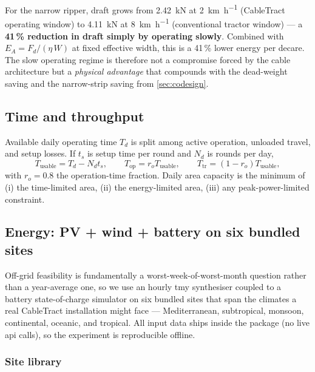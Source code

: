 \documentclass[11pt,a4paper]{article}
\begin{document}
For the narrow ripper, draft grows from \SI{2.42}{\kilo\newton} at \SI{2}{\kilo\meter\per\hour} (CableTract operating window) to \SI{4.11}{\kilo\newton} at \SI{8}{\kilo\meter\per\hour} (conventional tractor window) --- a \textbf{41\,\% reduction in draft simply by operating slowly}. Combined with $E_A = F_d/(\eta\,W)$ at fixed effective width, this is a 41\,\% lower energy per decare. The slow operating regime is therefore not a compromise forced by the cable architecture but a \emph{physical advantage} that compounds with the dead-weight saving and the narrow-strip saving from \cref{sec:codesign}.

\subsection{Time and throughput}\label{sec:time}

Available daily operating time $T_d$ is split among active operation, unloaded travel, and setup losses. If $t_s$ is setup time per round and $N_d$ is rounds per day,
\begin{equation}\label{eq:time}
T_{\text{usable}} = T_d - N_d t_s, \qquad
T_{\text{op}} = r_o T_{\text{usable}}, \qquad
T_{\text{tr}} = (1 - r_o) T_{\text{usable}},
\end{equation}
with $r_o = 0.8$ the operation-time fraction. Daily area capacity is the minimum of (i) the time-limited area, (ii) the energy-limited area, (iii) any peak-power-limited constraint.

\subsection{Energy: PV + wind + battery on six bundled sites}\label{sec:energy}

Off-grid feasibility is fundamentally a worst-week-of-worst-month question rather than a year-average one, so we use an hourly \gls{tmy} synthesiser coupled to a battery state-of-charge simulator on six bundled sites that span the climates a real CableTract installation might face --- Mediterranean, subtropical, monsoon, continental, oceanic, and tropical. All input data ships inside the package (no live \gls{api} calls), so the experiment is reproducible offline.

\subsubsection{Site library}\label{sec:sites}
\end{document}
